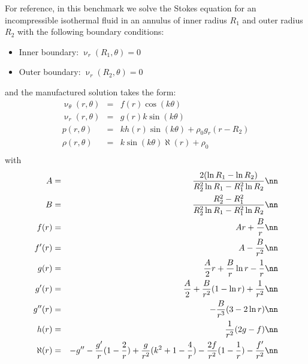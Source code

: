 For reference, in this benchmark we solve the Stokes equation for an incompressible
isothermal fluid in an annulus of inner radius $R_1$
and outer radius $R_2$ with the following boundary conditions:
\begin{itemize}
\item Inner boundary: $\upnu_r(R_1,\theta)=0$ 
\item Outer boundary: $\upnu_r(R_2,\theta)=0$ 
\end{itemize}
and the manufactured solution takes the form:
\begin{eqnarray}
\upnu_\theta(r,\theta) &=& f(r) \cos(k\theta) \\
\upnu_r(r,\theta) &=& g(r) k  \sin(k\theta)  \\
p(r,\theta) &=& k h(r) \sin(k \theta) + \rho_0 g_r (r-R_2)  \\
\rho(r,\theta) &=& k \sin (k \theta) \aleph(r) + \rho_0 \\
\end{eqnarray}
with
\begin{eqnarray}
A &=& \frac{2(\ln R_1 - \ln R_2)} { R_2^2 \ln R_1  - R_1^2 \ln R_2}    \nn\\
B &=& \frac{R_2^2-R_1^2}{R_2^2 \ln R_1 - R_1^2 \ln R_2} \nn\\
f(r)   &=& Ar +\frac{B}{r} \nn\\
f'(r)  &=& A - \frac{B}{r^2} \nn\\
g(r)   &=& \frac{A}{2}r  +  \frac{B}{r} \ln r - \frac{1}{r} \nn\\
g'(r)  &=& \frac{A}{2}  +  \frac{B}{r^2} (1-\ln r)   + \frac{1}{r^2} \nn\\
g''(r) &=&  - \frac{B}{r^3} (3 - 2 \ln r )  \nn\\
h(r)   &=& \frac{1}{r^2}(2g-f) \nn\\
\aleph(r) &=&  -g'' - \frac{g'}{r} ( 1 - \frac{2}{r}) + \frac{g}{r^2} (k^2 + 1 -\frac{4}{r})  - \frac{2f}{r^2}  (1-\frac{1}{r}) - \frac{f'}{r^2}   \nn
\end{eqnarray}


